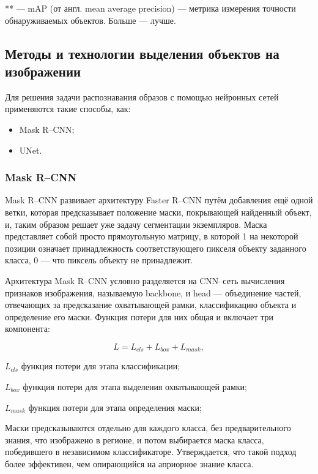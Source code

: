 ** --- mAP (от англ. mean average precision) --- метрика измерения точности обнаруживаемых объектов. Больше --- лучше.

\subsection{Методы и технологии выделения объектов на изображении}

Для решения задачи распознавания образов с помощью нейронных сетей применяются такие способы, как:
\begin{itemize}[leftmargin=1.6\parindent]
	\item Mask R--CNN;
	\item UNet. 
\end{itemize}

\subsubsection{Mask R--CNN}

Mask R--CNN развивает архитектуру Faster R--CNN путём добавления ещё одной ветки, которая предсказывает положение маски, покрывающей найденный объект, и, таким образом решает уже задачу сегментации экземпляров. Маска представляет собой просто прямоугольную матрицу, в которой 1 на некоторой позиции означает принадлежность соответствующего пикселя объекту заданного класса, 0 --- что пиксель объекту не принадлежит.

Архитектура Mask R--CNN условно разделяется на CNN--сеть вычисления признаков изображения, называемую backbone, и head --- объединение частей, отвечающих за предсказание охватывающей рамки, классификацию объекта и определение его маски. Функция потери для них общая и включает три компонента:

\begin{equation}
	\label{eq:nn11}
	L = L_{cls} + L_{box} + L_{mask},
\end{equation}
\begin{eqexpl}[15mm]
	\item{$L_{cls}$} функция потери для этапа классификации;
	\item{$L_{box}$} функция потери для этапа выделения охватывающей рамки;
	\item{$L_{mask}$} функция потери для этапа определения маски;
\end{eqexpl}

Маски предсказываются отдельно для каждого класса, без предварительного знания, что изображено в регионе, и потом выбирается маска класса, победившего в независимом классификаторе. Утверждается, что такой подход более эффективен, чем опирающийся на априорное знание класса.

